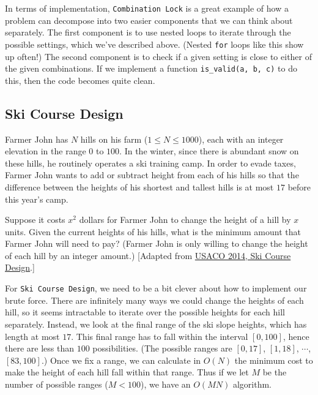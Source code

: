 In terms of implementation, \texttt{Combination Lock} is a great example of how a problem can decompose into two easier components that we can think about separately. The first component is to use nested loops to iterate through the possible settings, which we've described above. (Nested \texttt{for} loops like this show up often!) The second component is to check if a given setting is close to either of the given combinations. If we implement a function \texttt{is\_valid(a, b, c)} to do this, then the code becomes quite clean.

\subsection{Ski Course Design}

\begin{typewriter}
Farmer John has $N$ hills on his farm ($1\le N\le 1000$), each with an integer elevation in the range $0$ to $100$. In the winter, since there is abundant snow on these hills, he routinely operates a ski training camp. In order to evade taxes, Farmer John wants to add or subtract height from each of his hills so that the difference between the heights of his shortest and tallest hills is at most $17$ before this year's camp.

Suppose it costs $x^2$ dollars for Farmer John to change the height of a hill by $x$ units. Given the current heights of his hills, what is the minimum amount that Farmer John will need to pay? (Farmer John is only willing to change the height of each hill by an integer amount.) [Adapted from \href{http://usaco.org/index.php?page=viewproblem2&cpid=376}{USACO 2014, Ski Course Design}.]
\end{typewriter}

For \texttt{Ski Course Design}, we need to be a bit clever about how to implement our brute force. There are infinitely many ways we could change the heights of each hill, so it seems intractable to iterate over the possible heights for each hill separately. Instead, we look at the final range of the ski slope heights, which has length at most $17$. This final range has to fall within the interval $[0,100]$, hence there are less than $100$ possibilities. (The possible ranges are $[0, 17]$, $[1, 18]$, $\cdots$, $[83, 100]$.) Once we fix a range, we can calculate in $O(N)$ the minimum cost to make the height of each hill fall within that range. Thus if we let $M$ be the number of possible ranges ($M < 100$), we have an $O(MN)$ algorithm.

